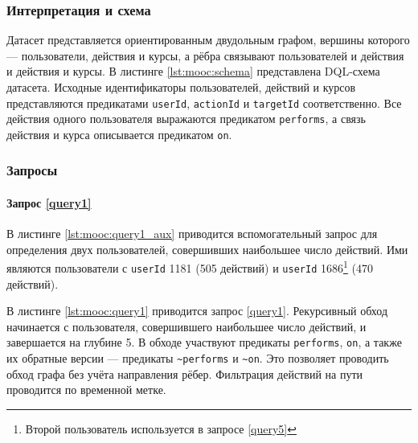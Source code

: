 \subsubsection{Интерпретация и схема}

Датасет представляется ориентированным двудольным графом, вершины которого --- пользователи, действия и курсы, а рёбра
связывают пользователей и действия и действия и курсы. В листинге \ref{lst:mooc:schema} представлена DQL-схема датасета.
Исходные идентификаторы пользователей, действий и курсов представляются предикатами \texttt{userId}, \texttt{actionId} и
\texttt{targetId} соответственно. Все действия одного пользователя выражаются предикатом \texttt{performs}, а связь
действия и курса описывается предикатом \texttt{on}.

\subsubsection{Запросы}

\paragraph{Запрос \ref{query1}}

В листинге \ref{lst:mooc:query1_aux} приводится вспомогательный запрос для определения двух пользователей, совершивших
наибольшее число действий. Ими являются пользователи с \texttt{userId} 1181 (505 действий) и \texttt{userId}
1686\footnote{Второй пользователь используется в запросе \ref{query5}} (470 действий).

В листинге \ref{lst:mooc:query1} приводится запрос \ref{query1}. Рекурсивный обход начинается с пользователя,
совершившего наибольшее число действий, и завершается на глубине 5. В обходе участвуют предикаты \texttt{performs},
\texttt{on}, а также их обратные версии --- предикаты \texttt{\textasciitilde performs} и \texttt{\textasciitilde on}.
Это позволяет проводить обход графа без учёта направления рёбер. Фильтрация действий на пути проводится по временной метке.

